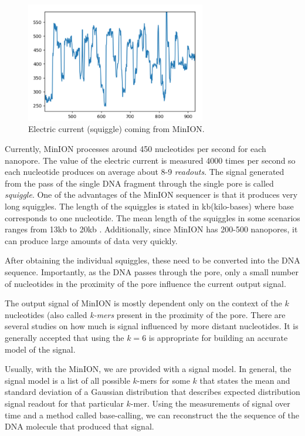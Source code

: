 \begin{figure}
\centerline{\includegraphics[width=0.7\textwidth, height=0.3\textheight]{images/signal}}
\caption[MinION signal]{Electric current (squiggle) coming from MinION.}
\label{obr:minIonCurrent}
\end{figure}

Currently, MinION processes around 450 nucleotides per second for each nanopore.
The value of the electric current is measured 4000 times per second so each
nucleotide produces on average about 8-9 \textit{readouts}. The signal
generated from the pass of the single DNA fragment through the single pore is called \textit{squiggle}.
One of the advantages of the MinION sequencer is that it produces very long squiggles.
The length of the squiggles is stated in kb(kilo-bases) where base corresponds to one nucleotide.
The mean length of the squiggles in some scenarios ranges from 13kb to 20kb \cite{tyson2018minion}. Additionally,
since MinION has 200-500 nanopores, it can produce large amounts of data very quickly.

After obtaining the individual squiggles, these need to be converted into the DNA
sequence. Importantly, as the DNA passes through the pore, only a small
number of nucleotides in the proximity of the pore influence the current output signal.

The output signal of MinION is mostly dependent only on the context of the $k$
nucleotides (also called \textit{k-mers} present in the proximity of the pore. There are several studies on
how much is signal influenced by more distant nucleotides. It is generally accepted
that using the $k = 6$ is appropriate for building an accurate model of the signal. 

Usually, with the MinION, we are provided with a signal model.
In general, the signal model is a list of all possible $k$-mers for some $k$
that states the mean and standard deviation of a Gaussian distribution that
describes expected distribution signal readout for that particular $k$-mer.
Using the measurements of signal over time and a method called base-calling, we can reconstruct the
the sequence of the DNA molecule that produced that signal.

